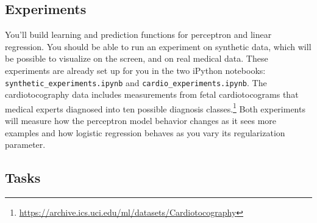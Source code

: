\documentclass[10pt]{article}
\begin{document}
\subsection*{Experiments}

You'll build learning and prediction functions for perceptron and linear regression. You should be able to run an experiment on synthetic data, which will be possible to visualize on the screen, and on real medical data. These experiments are already set up for you in the two iPython notebooks: \texttt{synthetic\_experiments.ipynb} and \texttt{cardio\_experiments.ipynb}. The cardiotocography data includes measurements from fetal cardiotocograms that medical experts diagnosed into ten possible diagnosis classes.\footnote{\url{https://archive.ics.uci.edu/ml/datasets/Cardiotocography}} Both experiments will measure how the perceptron model behavior changes as it sees more examples and how logistic regression behaves as you vary its regularization parameter. 

\subsection*{Tasks}
\end{document}
